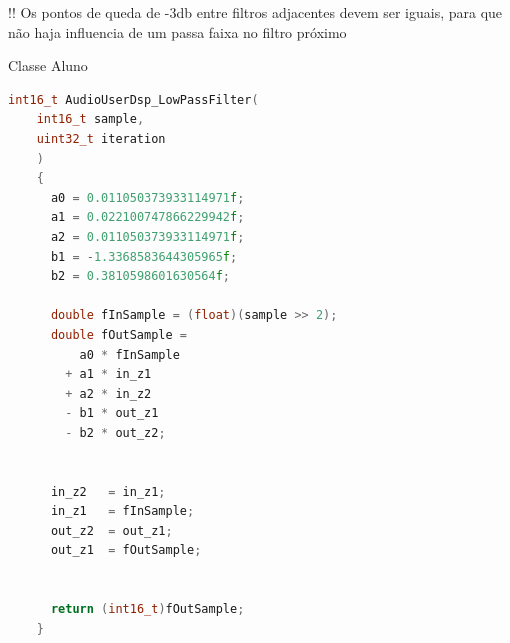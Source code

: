 !! Os pontos de queda de -3db entre filtros adjacentes devem ser iguais, para que não haja influencia de um passa faixa no filtro próximo

\begin{sourcecode}[htb]
\caption{\label{codigo:classeFoo}Classe Aluno}
\begin{lstlisting}[frame=single, language=c]
    int16_t AudioUserDsp_LowPassFilter(
    int16_t sample, 
    uint32_t iteration
    )
    {
      a0 = 0.011050373933114971f;
      a1 = 0.022100747866229942f;
      a2 = 0.011050373933114971f;
      b1 = -1.3368583644305965f;
      b2 = 0.3810598601630564f;
    
      double fInSample = (float)(sample >> 2);
      double fOutSample = 
          a0 * fInSample 
        + a1 * in_z1 
        + a2 * in_z2
        - b1 * out_z1
        - b2 * out_z2;
    
    
      in_z2   = in_z1;
      in_z1   = fInSample;
      out_z2  = out_z1;
      out_z1  = fOutSample;
    
    
      return (int16_t)fOutSample;
    }
\end{lstlisting}
\fonte{}
\end{sourcecode}
